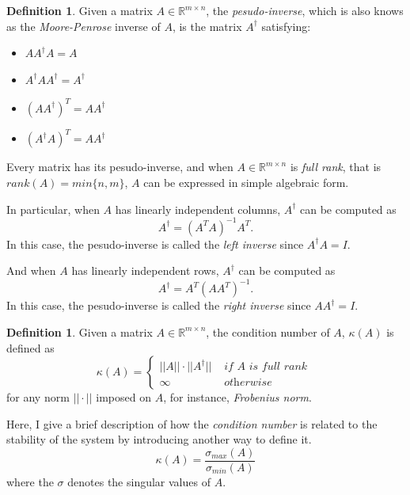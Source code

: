 \documentclass[12pt]{amsart}
\numberwithin{equation}{section}
\theoremstyle{definition}
\newtheorem{definition}[thm]{Definition}
\numberwithin{thm}{section}
\begin{document}
\begin{definition}
     Given a matrix $A \in \mathbb{R}^{m \times n}$, the \emph{pesudo-inverse},
     which is also knows as the \emph{Moore-Penrose} inverse of $A$, is the matrix
     $A^\dagger$ satisfying:
     \begin{itemize}
          \item $A A^\dagger A = A$
          \item $A^\dagger A A^\dagger = A^\dagger$
          \item $(A A^\dagger)^T = A A^\dagger$
          \item $(A^\dagger A)^T = A A^\dagger$
        \end{itemize}
\end{definition}

Every matrix has its pesudo-inverse, and when $A \in \mathbb{R}^{m \times n}$ is \emph{full rank}, 
that is $rank(A) = min\{n, m\}$, $A$ can be expressed in simple algebraic form.

In particular, when $A$ has linearly independent columns, $A^\dagger$ can be computed as
\begin{equation*}
     A^\dagger = (A^T A)^{-1} A^T.
\end{equation*}
In this case, the pesudo-inverse is called the \emph{left inverse} since $A^\dagger A = I$.

\smallskip
And when $A$ has linearly independent rows, $A^\dagger$ can be computed as
\begin{equation*}
     A^\dagger = A^T (A A^T)^{-1}.
\end{equation*}
In this case, the pesudo-inverse is called the \emph{right inverse} since $A A^\dagger = I$. 

\begin{definition}
     \label{def:COND}
     Given a matrix $A \in \mathbb{R}^{m \times n}$, the condition number of $A$, $\kappa(A)$ is defined as
     \begin{equation*}
          \kappa(A) = \begin{cases}
                ||A|| \cdot ||A^\dagger|| & \textit{ if } A \textit{ is full rank } \\
                \infty & \textit{ otherwise }
          \end{cases}
     \end{equation*}
     for any norm $|| \cdot ||$ imposed on $A$, for instance, \emph{Frobenius norm}.
\end{definition}

Here, I give a brief description of how the \emph{condition number} is related to the stability of the system by introducing another way to define it.
\begin{equation*}
     \kappa(A) = \frac{\sigma_{max} (A)}{\sigma_{min} (A)}
\end{equation*}
where the $\sigma$ denotes the singular values of $A$.
\end{document}
